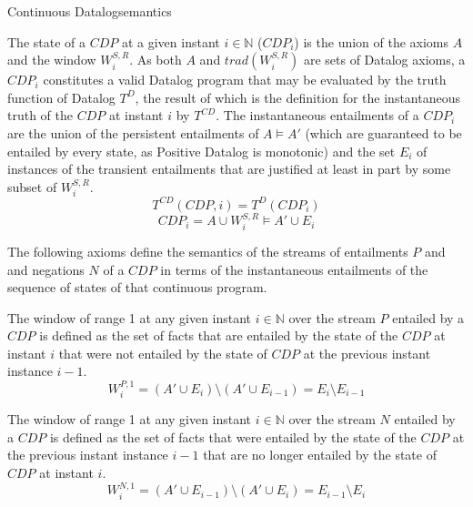 \begin{nestedsection}{Continuous Datalog}{semantics}
	\begin{definition}\label{def:continuous datalog: CDPt}
		The state of a ${CDP}$ at a given instant ${i \in \mathbb{N}}$ (${CDP_{i}}$) is the union of the axioms $A$ and the window $W^{S,R}_{i}$.
		As both $A$ and ${trad\left( W^{S,R}_{i} \right)}$ are sets of Datalog axioms, a ${CDP_{i}}$ constitutes a valid Datalog program that may be evaluated by the truth function of Datalog $T^{D}$, the result of which is the definition for the instantaneous truth of the ${CDP}$ at instant $i$ by $T^{CD}$.
		The instantaneous entailments of a $CDP_{i}$ are the union of the persistent entailments of ${A \vDash A'}$ (which are guaranteed to be entailed by every state, as Positive Datalog is monotonic) and the set $E_{i}$ of instances of the transient entailments that are justified at least in part by some subset of $W^{S,R}_{i}$.
		\begin{equation*}
			T^{CD} \left( CDP, i \right) = T^{D} \left( CDP_{i} \right)
		\end{equation*}
		\begin{equation*}
			CDP_{i} = A \cup W^{S,R}_{i} \vDash A' \cup E_{i}
		\end{equation*}
	\end{definition}


	The following axioms define the semantics of the streams of entailments $P$ and and negations $N$ of a ${CDP}$ in terms of the instantaneous entailments of the sequence of states of that continuous program.

	\begin{axiom}\label{axiom:continuous datalog: positive window increment}
		The window of range 1 at any given instant ${i \in \mathbb{N}}$ over the stream $P$ entailed by a ${CDP}$ is defined as the set of facts that are entailed by the state of the ${CDP}$ at instant $i$ that were not entailed by the state of ${CDP}$ at the previous instant instance ${i-1}$.
		\begin{equation*}
			W^{P,1}_{i} = \left( A' \cup E_{i} \right) \setminus \left( A' \cup E_{i-1} \right) = E_{i} \setminus E_{i-1}
		\end{equation*}
	\end{axiom}

	\begin{axiom}\label{axiom:continuous datalog: negative window increment}
		The window of range 1 at any given instant ${i \in \mathbb{N}}$ over the stream $N$ entailed by a ${CDP}$ is defined as the set of facts that were entailed by the state of the ${CDP}$ at the previous instant instance ${i-1}$ that are no longer entailed by the state of ${CDP}$ at instant $i$.
		\begin{equation*}
			W^{N,1}_{i} = \left( A' \cup E_{i-1} \right) \setminus \left( A' \cup E_{i} \right) = E_{i-1} \setminus E_{i}
		\end{equation*}
	\end{axiom}


\end{nestedsection}
